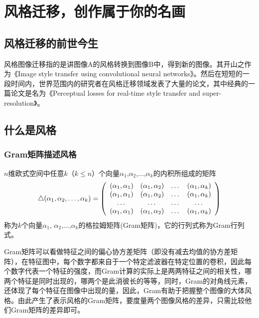 \chapter{风格迁移，创作属于你的名画}

\section{风格迁移的前世今生}

风格图像迁移指的是讲图像A的风格转换到图像B中，得到新的图像。其开山之作为《Image style transfer using convolutional neural networks》\cite{gatys2016image}。然后在短短的一段时间内，世界范围内的研究者在风格迁移领域发表了大量的论文，其中经典的一篇论文是名为《Perceptual losses for real-time style transfer and super-resolution》\cite{johnson2016perceptual}。

\section{什么是风格}
\subsection{Gram矩阵描述风格}
\begin{newdef}[Gram矩阵]
$n$维欧式空间中任意$k（k\leq n）$个向量$\alpha_1$,$\alpha_2$,$\ldots$,$\alpha_k$的内积所组成的矩阵
\begin{equation*}
\bigtriangleup (\alpha_1,\alpha_2,\ldots,\alpha_k) = 
\left(
\begin{array}{cccc}
(\alpha_1,\alpha_1) & (\alpha_1,\alpha_2) & $\ldots$ & (\alpha_1,\alpha_k) \\ (\alpha_1,\alpha_1) & (\alpha_1,\alpha_2) & $\ldots$ & (\alpha_1,\alpha_k) \\
$\ldots$ & $\ldots$ & $\ldots$ & $\ldots$ \\
(\alpha_1,\alpha_1) & (\alpha_1,\alpha_2) & $\ldots$ & (\alpha_1,\alpha_k) \\
\end{array}
\right)
\end{equation*}
称为$k$个向量$\alpha_1$, $\alpha_2$,$\ldots$,$\alpha_k$的格拉姆矩阵(Gram矩阵)，它的行列式称为Gram行列式。
\end{newdef}

Gram矩阵可以看做特征之间的偏心协方差矩阵（即没有减去均值的协方差矩阵），在特征图中，每个数字都来自于一个特定滤波器在特定位置的卷积，因此每个数字代表一个特征的强度，而Gram计算的实际上是两两特征之间的相关性，哪两个特征是同时出现的，哪两个是此消彼长的等等，同时，Gram的对角线元素，还体现了每个特征在图像中出现的量，因此，Gram有助于把握整个图像的大体风格。由此产生了表示风格的Gram矩阵，要度量两个图像风格的差异，只需比较他们Gram矩阵的差异即可。

